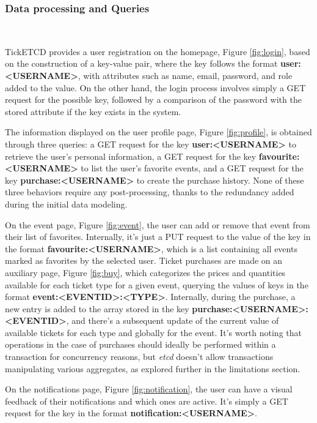 \documentclass[screen,review]{acmart}
\begin{document}
\subsubsection{Data processing and Queries}~\

TickETCD provides a user registration on the homepage, Figure \ref{fig:login}, based on the construction of a key-value pair, where the key follows the format \textbf{user:<USERNAME>}, with attributes such as name, email, password, and role added to the value. On the other hand, the login process involves simply a GET request for the possible key, followed by a comparison of the password with the stored attribute if the key exists in the system.

The information displayed on the user profile page, Figure \ref{fig:profile}, is obtained through three queries: a GET request for the key \textbf{user:<USERNAME>} to retrieve the user's personal information, a GET request for the key \textbf{favourite:<USERNAME>} to list the user's favorite events, and a GET request for the key \textbf{purchase:<USERNAME>} to create the purchase history. None of these three behaviors require any post-processing, thanks to the redundancy added during the initial data modeling.

On the event page, Figure \ref{fig:event}, the user can add or remove that event from their list of favorites. Internally, it's just a PUT request to the value of the key in the format \textbf{favourite:<USERNAME>}, which is a list containing all events marked as favorites by the selected user. Ticket purchases are made on an auxiliary page, Figure \ref{fig:buy}, which categorizes the prices and quantities available for each ticket type for a given event, querying the values of keys in the format \textbf{event:<EVENTID>:<TYPE>}. Internally, during the purchase, a new entry is added to the array stored in the key \textbf{purchase:<USERNAME>:<EVENTID>}, and there's a subsequent update of the current value of available tickets for each type and globally for the event. It's worth noting that operations in the case of purchases should ideally be performed within a transaction for concurrency reasons, but \textit{etcd} doesn't allow transactions manipulating various aggregates, as explored further in the limitations section.

On the notifications page, Figure \ref{fig:notification}, the user can have a visual feedback of their notifications and which ones are active. It's simply a GET request for the key in the format \textbf{notification:<USERNAME>}.
\end{document}
